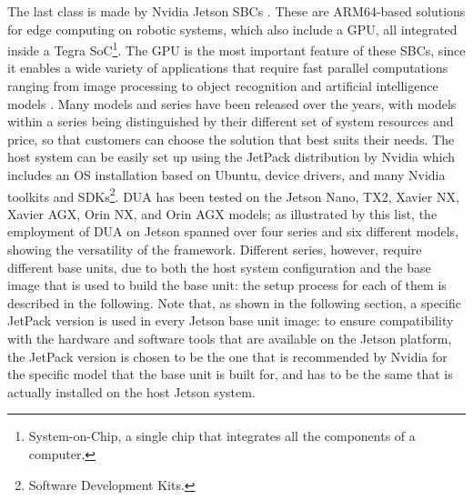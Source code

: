 The last class is made by Nvidia Jetson SBCs \cite{nvidia_jetson_nodate}. These are ARM64-based solutions for edge computing on robotic systems, which also include a GPU, all integrated inside a Tegra SoC\footnote{System-on-Chip, a single chip that integrates all the components of a computer.}. The GPU is the most important feature of these SBCs, since it enables a wide variety of applications that require fast parallel computations ranging from image processing to object recognition and artificial intelligence models \cite{song_hardware_2024}. Many models and series have been released over the years, with models within a series being distinguished by their different set of system resources and price, so that customers can choose the solution that best suits their needs. The host system can be easily set up using the JetPack distribution by Nvidia \cite{nvidia_jetpack_nodate} which includes an OS installation based on Ubuntu, device drivers, and many Nvidia toolkits and SDKs\footnote{Software Development Kits.}. DUA has been tested on the Jetson Nano, TX2, Xavier NX, Xavier AGX, Orin NX, and Orin AGX models; as illustrated by this list, the employment of DUA on Jetson spanned over four series and six different models, showing the versatility of the framework. Different series, however, require different base units, due to both the host system configuration and the base image that is used to build the base unit: the setup process for each of them is described in the following. Note that, as shown in the following section, a specific JetPack version is used in every Jetson base unit image: to ensure compatibility with the hardware and software tools that are available on the Jetson platform, the JetPack version is chosen to be the one that is recommended by Nvidia for the specific model that the base unit is built for, and has to be the same that is actually installed on the host Jetson system.

